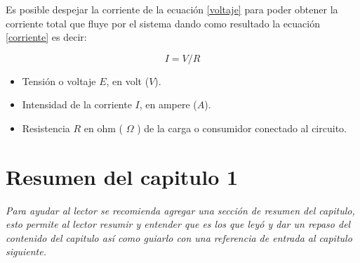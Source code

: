 Es posible despejar la corriente de la ecuación \ref{voltaje} para poder obtener la corriente total que fluye por el sistema dando como resultado la ecuación \ref{corriente} es decir:

\begin{equation}
I = V/R  
\label{corriente}
\end{equation}

\begin{itemize}
\item Tensión o voltaje $E$, en volt ($V$).
\item Intensidad de la corriente $I$, en ampere ($A$).
\item Resistencia $R$ en ohm ( $\Omega$ ) de la carga o consumidor conectado al circuito.
\end{itemize}

\section{ Resumen del capitulo 1 }

\textit{Para ayudar al lector se recomienda agregar una sección de resumen del capitulo, esto permite al lector resumir y entender que es los que leyó y dar un repaso del contenido del capitulo así como guiarlo con una referencia de entrada al capitulo siguiente.}



